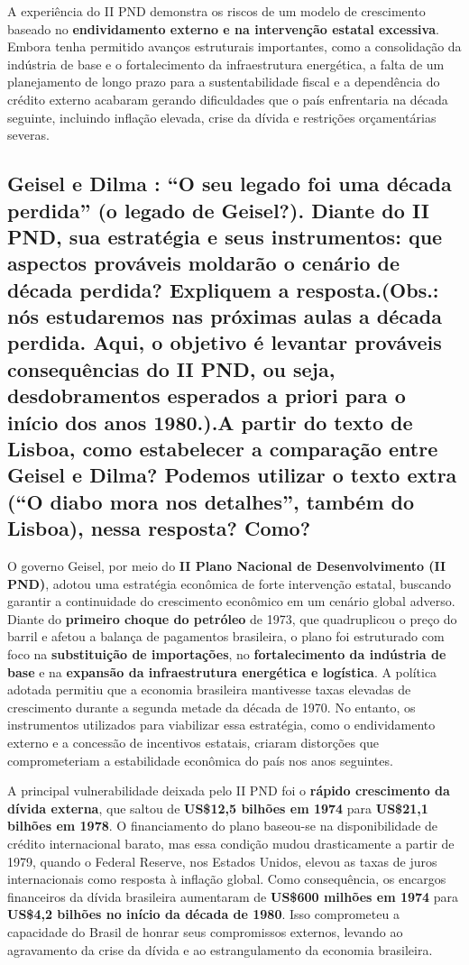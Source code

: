 \documentclass[a4paper,12pt]{article}[abntex2]
\begin{document}
A experiência do II PND demonstra os riscos de um modelo de crescimento baseado no \textbf{endividamento externo e na intervenção estatal excessiva}. Embora tenha permitido avanços estruturais importantes, como a consolidação da indústria de base e o fortalecimento da infraestrutura energética, a falta de um planejamento de longo prazo para a sustentabilidade fiscal e a dependência do crédito externo acabaram gerando dificuldades que o país enfrentaria na década seguinte, incluindo inflação elevada, crise da dívida e restrições orçamentárias severas.

\subsection{\textbf{Geisel e Dilma : “O seu legado foi uma década perdida” (o legado de Geisel?). Diante do II PND, sua estratégia e seus instrumentos: que aspectos prováveis moldarão o cenário de década perdida? Expliquem a resposta.(Obs.: nós estudaremos nas próximas aulas a década perdida. Aqui, o objetivo é levantar prováveis consequências do II PND, ou seja, desdobramentos esperados a priori para o início dos anos 1980.).A partir do texto de Lisboa, como estabelecer a comparação entre Geisel e Dilma? Podemos utilizar o texto extra (“O diabo mora nos detalhes”, também do Lisboa), nessa resposta? Como?}}

O governo Geisel, por meio do \textbf{II Plano Nacional de Desenvolvimento (II PND)}, adotou uma estratégia econômica de forte intervenção estatal, buscando garantir a continuidade do crescimento econômico em um cenário global adverso. Diante do \textbf{primeiro choque do petróleo} de 1973, que quadruplicou o preço do barril e afetou a balança de pagamentos brasileira, o plano foi estruturado com foco na \textbf{substituição de importações}, no \textbf{fortalecimento da indústria de base} e na \textbf{expansão da infraestrutura energética e logística}. A política adotada permitiu que a economia brasileira mantivesse taxas elevadas de crescimento durante a segunda metade da década de 1970. No entanto, os instrumentos utilizados para viabilizar essa estratégia, como o endividamento externo e a concessão de incentivos estatais, criaram distorções que comprometeriam a estabilidade econômica do país nos anos seguintes.

A principal vulnerabilidade deixada pelo II PND foi o \textbf{rápido crescimento da dívida externa}, que saltou de \textbf{US\$12,5 bilhões em 1974} para \textbf{US\$21,1 bilhões em 1978}. O financiamento do plano baseou-se na disponibilidade de crédito internacional barato, mas essa condição mudou drasticamente a partir de 1979, quando o Federal Reserve, nos Estados Unidos, elevou as taxas de juros internacionais como resposta à inflação global. Como consequência, os encargos financeiros da dívida brasileira aumentaram de \textbf{US\$600 milhões em 1974} para \textbf{US\$4,2 bilhões no início da década de 1980}. Isso comprometeu a capacidade do Brasil de honrar seus compromissos externos, levando ao agravamento da crise da dívida e ao estrangulamento da economia brasileira.
\end{document}
